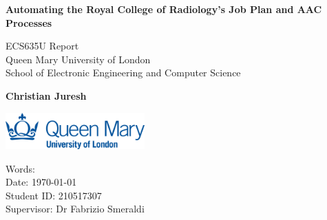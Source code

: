 
\begin{titlepage}
    \begin{center}
        
        \vspace*{1cm}
            
        \Huge
        \textbf{Automating the Royal College of Radiology’s Job Plan and AAC Processes}
            
        \vspace{1cm}

        \LARGE
        ECS635U Report \\
        Queen Mary University of London \\
        School of Electronic Engineering and Computer Science
            
        \vspace{1.5cm}
            
        \textbf{Christian Juresh}
            
        \vfill
            
    \begin{flushleft}       
        \includegraphics[width=0.4\textwidth]{images/qmul-logo.jpg}  

        \vspace{0.8cm}
 
        \Large
        Words: \wordcount \\
        Date: \today \\
        Student ID: 210517307\\
        Supervisor: Dr Fabrizio Smeraldi\\
    \end{flushleft}
    \end{center}
\end{titlepage}